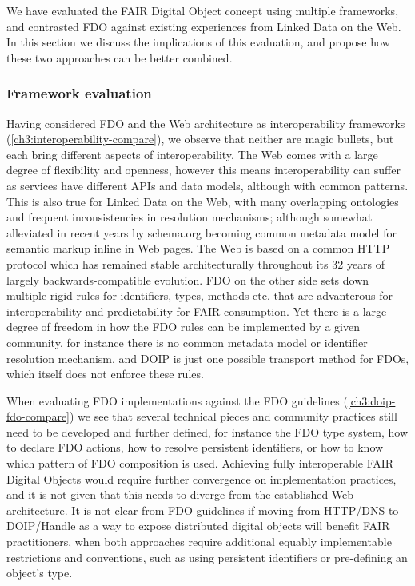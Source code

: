 We have evaluated the FAIR Digital Object concept using multiple frameworks, and contrasted FDO against existing experiences from Linked Data on the Web. In this section we discuss the implications of this evaluation, and propose how these two approaches can be better combined.

\subsubsection{Framework evaluation}

Having considered FDO and the Web architecture as interoperability frameworks (\vref*{ch3:interoperability-compare}), we observe that neither are magic bullets, but each bring different aspects of interoperability. The Web comes with a large degree of flexibility and openness, however this means interoperability can suffer as services have different APIs and data models, although with common patterns. This is also true for Linked Data on the Web, with many overlapping ontologies and frequent inconsistencies in resolution mechanisms; although somewhat alleviated in recent years by schema.org becoming common metadata model for semantic markup inline in Web pages. The Web is based on a common HTTP protocol which has remained stable architecturally throughout its 32 years of largely backwards-compatible evolution. FDO on the other side sets down multiple rigid rules for identifiers, types, methods etc. that are advanterous for interoperability and predictability for FAIR consumption. Yet there is a large degree of freedom in how the FDO rules can be implemented by a given community, for instance there is no common metadata model or identifier resolution mechanism, and DOIP is just one possible transport method for FDOs, which itself does not enforce these rules. 

When evaluating FDO implementations against the FDO guidelines (\vref*{ch3:doip-fdo-compare}) we see that several technical pieces and community practices still need to be developed and further defined, for instance the FDO type system, how to declare FDO actions, how to resolve persistent identifiers, or how to know which pattern of FDO composition is used. Achieving fully interoperable FAIR Digital Objects would require further convergence on implementation practices, and it is not given that this needs to diverge from the established Web architecture.  It is not clear from FDO guidelines if moving from HTTP/DNS to DOIP/Handle as a way to expose distributed digital objects will benefit FAIR practitioners, when both approaches require additional equably implementable restrictions and conventions, such as using persistent identifiers or pre-defining an object's type. 

